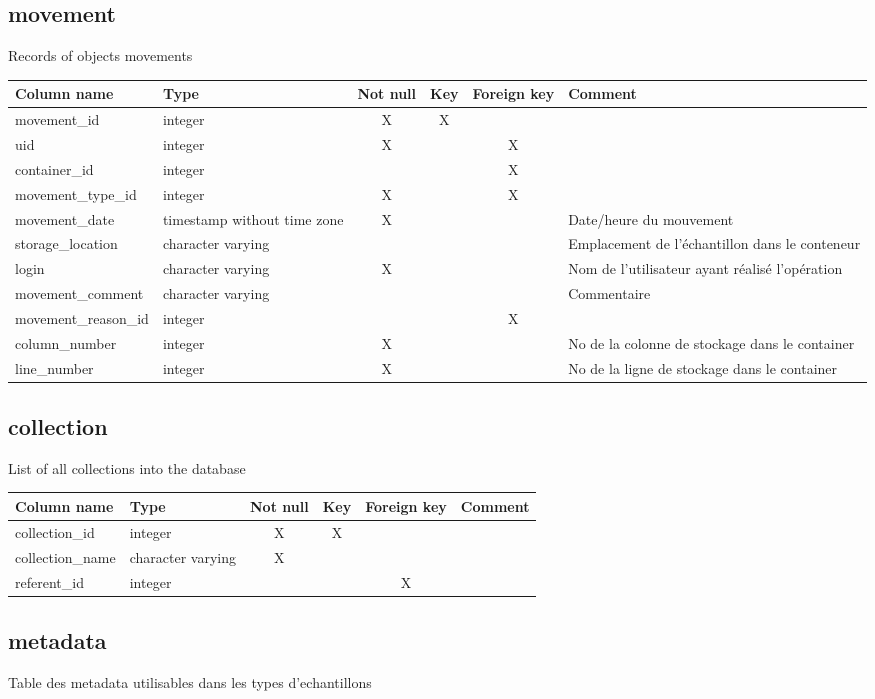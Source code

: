 \subsection{movement}
Records of objects movements

\begin{tabular}{|l| p{2cm}|c|c|c| p{3cm}|}
\hline
Column name & Type & Not null & Key & Foreign key & Comment \\
\hline
movement\_id & integer & X & X & & \\
\hline
uid & integer & X & & X & \\
\hline
container\_id & integer & & & X & \\
\hline
movement\_type\_id & integer & X & & X & \\
\hline
movement\_date & timestamp without time zone & X & & & Date/heure du mouvement\\
\hline
storage\_location & character varying & & & & Emplacement de l'échantillon dans le conteneur\\
\hline
login & character varying & X & & & Nom de l'utilisateur ayant réalisé l'opération\\
\hline
movement\_comment & character varying & & & & Commentaire\\
\hline
movement\_reason\_id & integer & & & X & \\
\hline
column\_number & integer & X & & & No de la colonne de stockage dans le container\\
\hline
line\_number & integer & X & & & No de la ligne de stockage dans le container\\
\hline
\end{tabular}
\subsection{collection}
List of all collections into the database

\begin{tabular}{|l| p{2cm}|c|c|c| p{3cm}|}
\hline
Column name & Type & Not null & Key & Foreign key & Comment \\
\hline
collection\_id & integer & X & X & & \\
\hline
collection\_name & character varying & X & & & \\
\hline
referent\_id & integer & & & X & \\
\hline
\end{tabular}
\subsection{metadata}
Table des metadata utilisables dans les types d'echantillons

